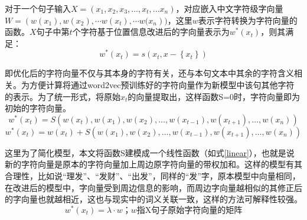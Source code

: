 \documentclass[winfonts,master,oneside,nobackinfo]{njuthesis}
\begin{document}
对于一个句子输入$X=\left(x_{1}, x_{2}, x_{3},...,x_{t},... x_{n}\right)$，对应嵌入中文字符级字向量$W=\left(w\left(x_{1}\right), w\left(x_{2}\right), \cdots w\left(x_{t}\right), \cdots w(x_{n}\right))$，这里$w$表示字符转换为字符向量的函数。$X$句子中第$t$个字符基于位置信息改进后的字向量表示为$w^{*}(x_{t})$，则其满足：
\begin{equation}
w^{*}\left(x_{t}\right)=s\left(x_{t}, x-\left\{x_{t}\right\}\right)
\end{equation}

即优化后的字符向量不仅与其本身的字符有关，还与本句文本中其余的字符含义相关。为方便计算将通过word2vec预训练好的字符向量作为新模型中该句其他字符的表示。为了统一形式，将原始$x_{t}$的向量提取出，这样函数S=0时，字符向量即为初始的字符向量。
\begin{equation}
w^{*}\left(x_{t}\right)=S\left(w\left(x_{t}\right), w\left(x_{1}\right), w\left(x_{2}\right), \ldots, w\left(x_{t-1}\right), w\left(x_{t+1}\right), \ldots, w\left(x_{n}\right)\right)
\end{equation}
\begin{equation}
w^{*}\left(x_{t}\right)=w\left(x_{t}\right)+S\left( w\left(x_{1}\right), w\left(x_{2}\right), \ldots, w\left(x_{t-1}\right), w\left(x_{t+1}\right), \ldots, w\left(x_{n}\right)\right)
\end{equation}

这里为了简化模型，本文将函数S建模成一个线性函数（如式\ref{linear}），也就是说新的字符向量是原本的字符向量加上周边原字符向量的带权加和。这样的模型有其合理性，比如说“理发”、“发财”、“出发”，同样的“发”字，原本模型中向量相同，在改进后的模型中，字向量受到周边信息的影响，而周边字向量越相似的其修正后的字向量也就越相近，这也与现实中的词义关联一致，这样的方法可解释性较强。
\begin{equation}
w^{*}\left(x_{t}\right)=\lambda \cdot w \mbox{；} w \mbox{指X句子原始字符向量的矩阵}
\label{linear}
\end{equation}
\end{document}
